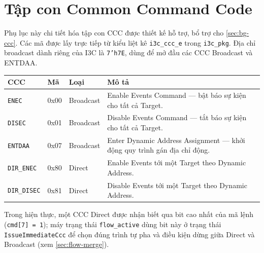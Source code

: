 \chapter{Tập con Common Command Code}
\label{app:ccc}

Phụ lục này chi tiết hóa tập con CCC được thiết kế hỗ trợ, bổ trợ cho \cref{sec:bg-ccc}. Các mã được lấy
trực tiếp từ kiểu liệt kê \texttt{i3c\_ccc\_e} trong \texttt{i3c\_pkg}. Địa chỉ broadcast dành riêng của
I3C là \texttt{7'h7E}, dùng để mở đầu các CCC Broadcast và ENTDAA.

\begin{longtable}{L{2.8cm} C{2.0cm} C{2.2cm} L{6.0cm}}
  \toprule
  \textbf{CCC} & \textbf{Mã} & \textbf{Loại} & \textbf{Mô tả} \\
  \midrule\endhead
  \texttt{ENEC}      & 0x00 & Broadcast & Enable Events Command — bật báo sự kiện cho tất cả Target. \\
  \texttt{DISEC}     & 0x01 & Broadcast & Disable Events Command — tắt báo sự kiện cho tất cả Target. \\
  \texttt{ENTDAA}    & 0x07 & Broadcast & Enter Dynamic Address Assignment — khởi động quy trình gán địa
                                          chỉ động. \\
  \texttt{DIR\_ENEC}  & 0x80 & Direct    & Enable Events tới một Target theo Dynamic Address. \\
  \texttt{DIR\_DISEC} & 0x81 & Direct    & Disable Events tới một Target theo Dynamic Address. \\
  \bottomrule
\end{longtable}

Trong hiện thực, một CCC Direct được nhận biết qua bit cao nhất của mã lệnh (\texttt{cmd[7] = 1}); máy
trạng thái \texttt{flow\_active} dùng bit này ở trạng thái \texttt{IssueImmediateCcc} để chọn đúng trình tự
pha và điều kiện dừng giữa Direct và Broadcast (xem \cref{sec:flow-merge}).
